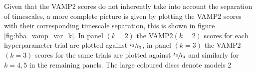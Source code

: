 \documentclass[journal=jacsat,manuscript=article]{achemso}
\newcommand*\sref[1]{%
    S\ref{#1}}
\begin{document}
Given that the VAMP2 scores do not inherently take into account the separation of timescales, a more complete picture is given by plotting the VAMP2 scores with their corresponding timescale separation, this is shown in figure \ref{fig:bba_vamp_var_k}.  In panel $(k=2)$ the VAMP2$(k=2)$ scores for each hyperparameter trial are plotted against $\sfrac{t_2}{t_3}$, in panel $(k=3)$ the VAMP2$(k=3)$ scores for the same trials are plotted against $\sfrac{t_3}{t_4}$ and similarly for $k=4, 5$ in the remaining panels. The large coloured discs denote models 2 






\end{document}
